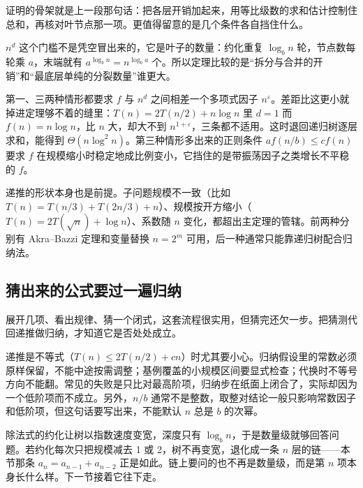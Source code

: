 证明的骨架就是上一段那句话：把各层开销加起来，用等比级数的求和估计控制住总和，再核对叶节点那一项。更值得留意的是几个条件各自挡住什么。

\(n^{d}\) 这个门槛不是凭空冒出来的，它是叶子的数量：约化重复 \(\log_b n\) 轮，节点数每轮乘 \(a\)，末端就有 \(a^{\log_b n}=n^{\log_b a}\) 个。所以定理比较的是``拆分与合并的开销''和``最底层单纯的分裂数量''谁更大。

第一、三两种情形都要求 \(f\) 与 \(n^{d}\) 之间相差一个多项式因子 \(n^{\varepsilon}\)。差距比这更小就掉进定理够不着的缝里：\(T(n)=2T(n/2)+n\log n\) 里 \(d=1\) 而 \(f(n)=n\log n\)，比 \(n\) 大，却大不到 \(n^{1+\varepsilon}\)，三条都不适用。这时退回递归树逐层求和，能得到 \(\Theta(n\log^2 n)\)。第三种情形多出来的正则条件 \(a f(n/b)\le cf(n)\) 要求 \(f\) 在规模缩小时稳定地成比例变小，它挡住的是带振荡因子之类增长不平稳的 \(f\)。

递推的形状本身也是前提。子问题规模不一致（比如 \(T(n)=T(n/3)+T(2n/3)+n\)）、规模按开方缩小（\(T(n)=2T(\sqrt n)+\log n\)）、系数随 \(n\) 变化，都超出主定理的管辖。前两种分别有 Akra--Bazzi 定理和变量替换 \(n=2^{m}\) 可用，后一种通常只能靠递归树配合归纳法。

\subsection{猜出来的公式要过一遍归纳}

展开几项、看出规律、猜一个闭式，这套流程很实用，但猜完还欠一步。把猜测代回递推做归纳，才知道它是否处处成立。

递推是不等式（\(T(n)\le2T(n/2)+cn\)）时尤其要小心。归纳假设里的常数必须原样保留，不能中途按需调整；基例覆盖的小规模区间要显式检查；代换时不等号方向不能翻。常见的失败是只比对最高阶项，归纳步在纸面上闭合了，实际却因为一个低阶项而不成立。另外，\(n/b\) 通常不是整数，取整对结论一般只影响常数因子和低阶项，但这句话要写出来，不能默认 \(n\) 总是 \(b\) 的次幂。

除法式的约化让树以指数速度变宽，深度只有 \(\log_b n\)，于是数量级就够回答问题。若约化每次只把规模减去 1 或 2，树不再变宽，退化成一条 \(n\) 层的链——本节那条 \(a_n=a_{n-1}+a_{n-2}\) 正是如此。链上要问的也不再是数量级，而是第 \(n\) 项本身长什么样。下一节接着它往下走。
